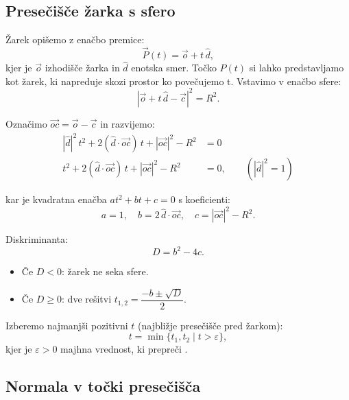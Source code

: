 \documentclass[a4paper,12pt]{article}
\begin{document}
    \subsection{Presečišče žarka s sfero}

    Žarek opišemo z enačbo premice:
    \begin{equation}
        \vec{P}(t) = \vec{o} + t\,\hat{d},
    \end{equation}
    kjer je $\vec{o}$ izhodišče žarka in $\hat{d}$ enotska smer.
    Točko $P(t)$ si lahko predstavljamo kot žarek, ki napreduje skozi prostor ko povečujemo t.
    Vstavimo v enačbo sfere:
    \begin{equation}
        |\vec{o} + t\,\hat{d} - \vec{c}|^2 = R^2.
    \end{equation}

    Označimo $\vec{oc} = \vec{o} - \vec{c}$ in razvijemo:
    \begin{align}
        |\hat{d}|^2\,t^2 + 2(\hat{d}\cdot\vec{oc})\,t + |\vec{oc}|^2 - R^2 &= 0 \\
        t^2 + 2(\hat{d}\cdot\vec{oc})\,t + |\vec{oc}|^2 - R^2 &= 0, \qquad (|\hat{d}|^2 = 1)
    \end{align}

    kar je kvadratna enačba $at^2 + bt + c = 0$ s koeficienti:
    \begin{equation}
        a = 1, \quad b = 2\,\hat{d}\cdot\vec{oc}, \quad c = |\vec{oc}|^2 - R^2.
    \end{equation}

    Diskriminanta:
    \begin{equation}
        D = b^2 - 4c.
    \end{equation}

    \begin{itemize}
        \item Če $D < 0$: žarek ne seka sfere.
        \item Če $D \geq 0$: dve rešitvi $t_{1,2} = \dfrac{-b \pm \sqrt{D}}{2}$.
    \end{itemize}

    Izberemo najmanjši pozitivni $t$ (najbližje presečišče pred žarkom):
    \begin{equation}
        t = \min\{t_1, t_2 \mid t > \varepsilon\},
    \end{equation}
    kjer je $\varepsilon > 0$ majhna vrednost, ki prepreči .

    \subsection{Normala v točki presečišča}
\end{document}
